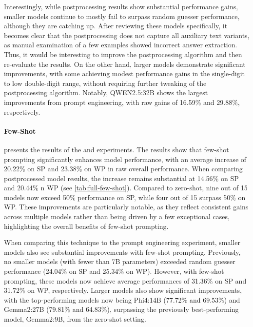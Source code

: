 Interestingly, while postprocessing results show substantial performance gains, smaller models continue to mostly fail to surpass random guesser performance, although they are catching up. After reviewing these models specifically, it becomes clear that the postprocessing does not capture all auxiliary text variants, as manual examination of a few examples showed incorrect answer extraction. Thus, it would be interesting to improve the postprocessing algorithm and then re-evaluate the results. On the other hand, larger models demonstrate significant improvements, with some achieving modest performance gains in the single-digit to low double-digit range, without requiring further tweaking of the postprocessing algorithm. Notably, QWEN2.5:32B shows the largest improvements from prompt engineering, with raw gains of 16.59\% and 29.88\%, respectively.

\paragraph{Few-Shot}
\label{par:few-shot}

 presents the results of the  and  experiments. The results show that few-shot prompting significantly enhances model performance, with an average increase of 20.22\% on \ac{SP} and 23.38\% on \ac{WP} in raw overall performance. When comparing postprocessed model results, the increase remains substantial at 14.56\% on \ac{SP} and 20.44\% n \ac{WP} (see \cref{tab:full-few-shot}). Compared to zero-shot, nine out of 15 models now exceed 50\% performance on \ac{SP}, while four out of 15 surpass 50\% on \ac{WP}. These improvements are particularly notable, as they reflect consistent gains across multiple models rather than being driven by a few exceptional cases, highlighting the overall benefits of few-shot prompting.

When comparing this technique to the prompt engineering experiment, smaller models also see substantial improvements with few-shot prompting. Previously, no smaller models (with fewer than 7B parameters) exceeded random guesser performance (24.04\% on \ac{SP} and 25.34\% on \ac{WP}). However, with few-shot prompting, these models now achieve average performances of 31.36\% on \ac{SP} and 31.72\% on \ac{WP}, respectively. Larger models also show significant improvements, with the top-performing models now being Phi4:14B (77.72\% and 69.53\%) and Gemma2:27B (79.81\% and 64.83\%), surpassing the previously best-performing model, Gemma2:9B, from the zero-shot setting.


